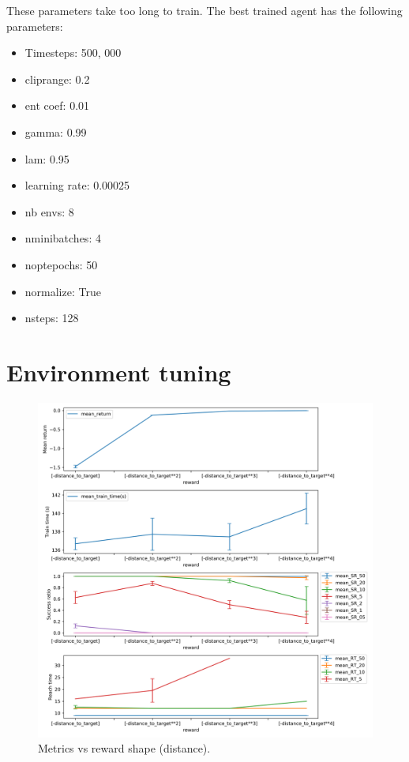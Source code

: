 \documentclass{article}
\begin{document}
These parameters take too long to train. The best trained agent has the following parameters:

\begin{itemize}
  \item Timesteps: 500, 000
  \item cliprange: 0.2
  \item ent coef: 0.01
  \item gamma: 0.99
  \item lam: 0.95
  \item learning rate: 0.00025
  \item nb envs: 8
  \item nminibatches: 4
  \item noptepochs: 50
  \item normalize: True
  \item nsteps: 128
\end{itemize} 


\section{Environment tuning}


\begin{figure}[H]
    \centering
    \includegraphics[width=\textwidth]{../reward_dist.png}
\caption{Metrics vs reward shape (distance).}
\end{figure}
\end{document}
